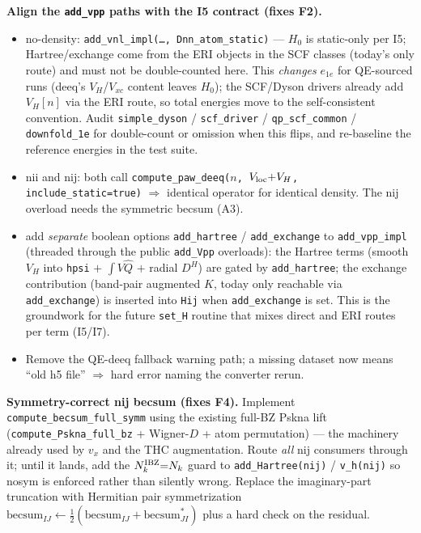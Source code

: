 \documentclass[11pt]{article}
\newcommand{\code}[1]{\texttt{\small #1}}
\newcommand{\Qhat}{\hat{Q}}
\newcommand{\becsum}{\mathrm{becsum}}
\begin{document}
\begin{description}[leftmargin=2.6em,style=nextline]
\item[A2.] \textbf{Align the \code{add\_vpp} paths with the I5 contract
(fixes F2).}
\begin{itemize}[leftmargin=1.4em]
\item no-density: \code{add\_vnl\_impl(\ldots, Dnn\_atom\_static)} --- $H_0$
is static-only per I5; Hartree/exchange come from the ERI objects in the
SCF classes (today's only route) and must not be double-counted here. This
\emph{changes} $e_{1e}$ for QE-sourced runs
(deeq's $V_H$/$V_{xc}$ content leaves $H_0$); the SCF/Dyson drivers already
add $V_H[n]$ via the ERI route, so total energies move to the
self-consistent convention. Audit \code{simple\_dyson} /
\code{scf\_driver} / \code{qp\_scf\_common} / \code{downfold\_1e} for
double-count or omission when this flips, and re-baseline the reference
energies in the test suite.
\item nii and nij: both call \code{compute\_paw\_deeq($n$,
$V_{\rm loc}{+}V_H$, include\_static=true)} $\Rightarrow$ identical operator
for identical density. The nij overload needs the symmetric becsum (A3).
\item add \emph{separate} boolean options \code{add\_hartree} /
\code{add\_exchange} to \code{add\_vpp\_impl} (threaded through the public
\code{add\_Vpp} overloads): the Hartree terms (smooth $V_H$ into
\code{hpsi} $+$ $\int V\Qhat$ $+$ radial $D^H$) are gated by
\code{add\_hartree}; the exchange contribution (band-pair augmented $K$,
today only reachable via \code{add\_exchange}) is inserted into \code{Hij}
when \code{add\_exchange} is set. This is the groundwork for the future
\code{set\_H} routine that mixes direct and ERI routes per term (I5/I7).
\item Remove the QE-deeq fallback warning path; a missing dataset now means
``old h5 file'' $\Rightarrow$ hard error naming the converter rerun.
\end{itemize}

\item[A3.] \textbf{Symmetry-correct nij becsum (fixes F4).}
Implement \code{compute\_becsum\_full\_symm} using the existing full-BZ
Pskna lift (\code{compute\_Pskna\_full\_bz} + Wigner-$D$ + atom
permutation) --- the machinery already used by $v_x$ and the THC
augmentation. Route \emph{all} nij consumers through it; until it lands, add
the $N_k^{\rm IBZ}{=}N_k$ guard to \code{add\_Hartree(nij)} /
\code{v\_h(nij)} so nosym is enforced rather than silently wrong. Replace
the imaginary-part truncation with Hermitian pair symmetrization
$\becsum_{IJ} \leftarrow \tfrac12(\becsum_{IJ} + \becsum_{JI}^{*})$ plus a
hard check on the residual.


\end{description}
\end{document}
